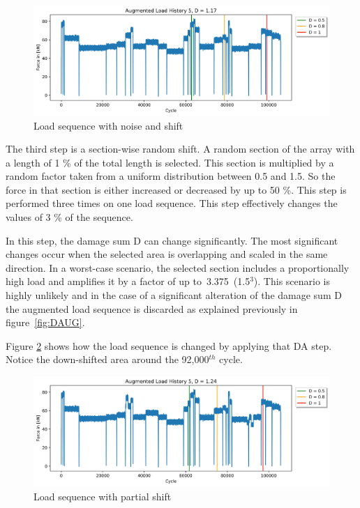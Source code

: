 \begin{figure}[H]
	\centering
	\includegraphics[width=1\linewidth]{IMGs/Verlauf_5_noise.jpg}
	\caption{Load sequence with noise and shift}
	\label{fig:V5_shift}
\end{figure}

The third step is a section-wise random shift. A random section of the array with a length of 1 \% of the total length is selected. This section is multiplied by a random factor taken from a uniform distribution between 0.5 and 1.5. So the force in that section is either increased or decreased by up to 50 \%. This step is performed three times on one load sequence. This step effectively changes the values of 3 \% of the sequence. 

In this step, the damage sum D can change significantly. The most significant changes occur when the selected area is overlapping and scaled in the same direction. In a worst-case scenario, the selected section includes a proportionally high load and amplifies it by a factor of up to~3.375~(1.5\(^3\)). This scenario is highly unlikely and in the case of a significant alteration of the damage sum D the augmented load sequence is discarded as explained previously in figure~\ref{fig:DAUG}.
 
Figure \ref{fig:Verlauf_5_shift_partial} shows how the load sequence is changed by applying that DA step. Notice the down-shifted area around the 92,000\(^{th}\) cycle.


\begin{figure}[H]
	\centering
	\includegraphics[width=1\linewidth]{IMGs/Verlauf_5_shift_partial.jpg}
	\caption{Load sequence with partial shift}
	\label{fig:Verlauf_5_shift_partial}
\end{figure}

